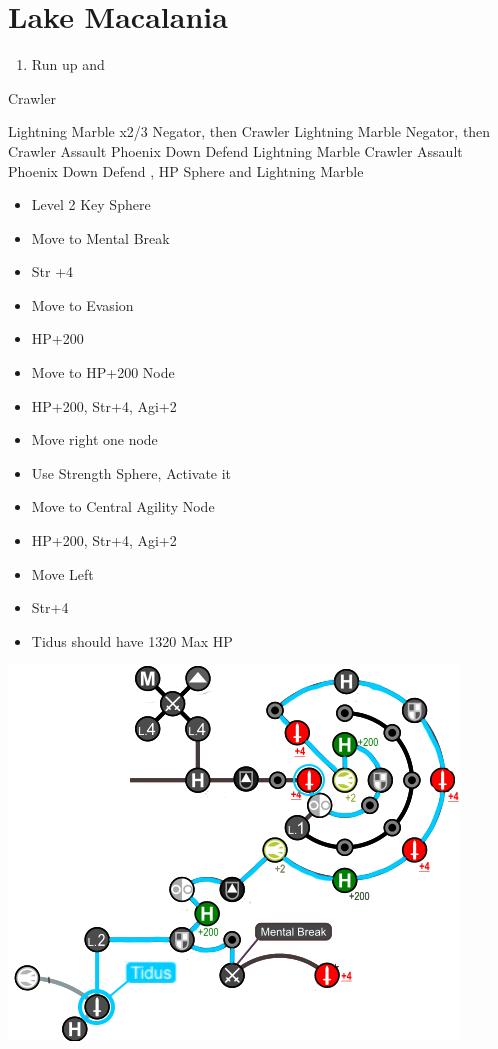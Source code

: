 \chapter{Lake Macalania}

\begin{enumerate}
	\item Run up and \sd
\end{enumerate}
\begin{battle}[1600]{Crawler}
\begin{itemize}
	\switch{\tidus}{\rikku}
	\rikkuf Lightning Marble x2/3 Negator, then Crawler
	\kimahrif Lightning Marble Negator, then Crawler
	\enemyf Assault \rikku
	\luluf Phoenix Down \rikku
	\switch{\kimahri}{\yuna}
	\yunaf Defend
	\rikkuf Lightning Marble Crawler
	\enemyf Assault \rikku
	\luluf Phoenix Down \rikku
	\switch{\yuna}{\tidus}
	\tidusf Defend
	\rikkuf \od, HP Sphere and Lightning Marble
\end{itemize}
\end{battle}
\begin{spheregrid}
\begin{itemize}
	\tidusf
	\begin{itemize}
		\item Level 2 Key Sphere
		\item Move to Mental Break
		\item Str +4
		\item Move to Evasion
		\item HP+200
		\item Move to HP+200 Node
		\item HP+200, Str+4, Agi+2
		\item Move right one node
		\item Use Strength Sphere, Activate it
		\item Move to Central Agility Node
		\item HP+200, Str+4, Agi+2
		\item Move Left
		\item Str+4
		\item Tidus should have 1320 Max HP
	\end{itemize}
	\includegraphics[width=.8\columnwidth]{graphics/Tidus_post_crawler}
\end{itemize}
\end{spheregrid}
